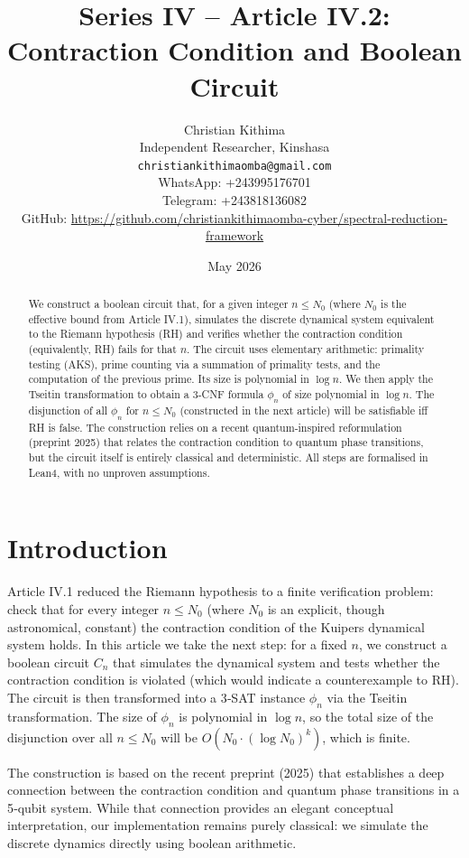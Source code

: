 \documentclass[11pt,a4paper]{article}
\title{Series IV – Article IV.2: Contraction Condition and Boolean Circuit}
\author{Christian Kithima \\
Independent Researcher, Kinshasa \\
\texttt{christiankithimaomba@gmail.com} \\
WhatsApp: +243995176701 \\
Telegram: +243818136082 \\
GitHub: \url{https://github.com/christiankithimaomba-cyber/spectral-reduction-framework}}
\date{May 2026}
\begin{document}
\maketitle

\begin{abstract}
We construct a boolean circuit that, for a given integer \(n \le N_0\) (where \(N_0\) is the effective bound from Article IV.1), simulates the discrete dynamical system equivalent to the Riemann hypothesis (RH) and verifies whether the contraction condition (equivalently, RH) fails for that \(n\). The circuit uses elementary arithmetic: primality testing (AKS), prime counting via a summation of primality tests, and the computation of the previous prime. Its size is polynomial in \(\log n\). We then apply the Tseitin transformation to obtain a 3‑CNF formula \(\phi_n\) of size polynomial in \(\log n\). The disjunction of all \(\phi_n\) for \(n \le N_0\) (constructed in the next article) will be satisfiable iff RH is false. The construction relies on a recent quantum‑inspired reformulation (preprint 2025) that relates the contraction condition to quantum phase transitions, but the circuit itself is entirely classical and deterministic. All steps are formalised in Lean4, with no unproven assumptions.
\end{abstract}

\tableofcontents

\section{Introduction}

Article IV.1 reduced the Riemann hypothesis to a finite verification problem: check that for every integer \(n \le N_0\) (where \(N_0\) is an explicit, though astronomical, constant) the contraction condition of the Kuipers dynamical system holds. In this article we take the next step: for a fixed \(n\), we construct a boolean circuit \(C_n\) that simulates the dynamical system and tests whether the contraction condition is violated (which would indicate a counterexample to RH). The circuit is then transformed into a 3‑SAT instance \(\phi_n\) via the Tseitin transformation. The size of \(\phi_n\) is polynomial in \(\log n\), so the total size of the disjunction over all \(n\le N_0\) will be \(O(N_0 \cdot (\log N_0)^k)\), which is finite.

The construction is based on the recent preprint (2025) that establishes a deep connection between the contraction condition and quantum phase transitions in a 5‑qubit system. While that connection provides an elegant conceptual interpretation, our implementation remains purely classical: we simulate the discrete dynamics directly using boolean arithmetic.
\end{document}
